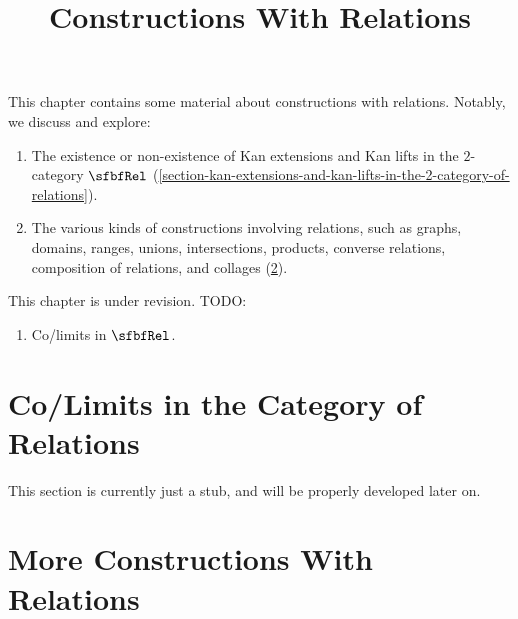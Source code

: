 

%



\title{Constructions With Relations}

\maketitle

\label{section-phantom}

This chapter contains some material about constructions with relations. Notably, we discuss and explore:
\begin{enumerate}
    \item\label{constructions-with-relations-introduction-item-1}The existence or non-existence of Kan extensions and Kan lifts in the $2$-category $\sfbfRel$ (\cref{section-kan-extensions-and-kan-lifts-in-the-2-category-of-relations}).
    \item\label{constructions-with-relations-introduction-item-2}The various kinds of constructions involving relations, such as graphs, domains, ranges, unions, intersections, products, converse relations, composition of relations, and collages (\cref{section-more-constructions-with-relations}).
\end{enumerate}
This chapter is under revision. TODO:
\begin{enumerate}
    \item Co/limits in $\sfbfRel$.
\end{enumerate}

\ChapterTableOfContents

\section{Co/Limits in the Category of Relations}\label{section-co-limits-in-the-category-of-relations}
This section is currently just a stub, and will be properly developed later on.
\section{More Constructions With Relations}\label{section-more-constructions-with-relations}
